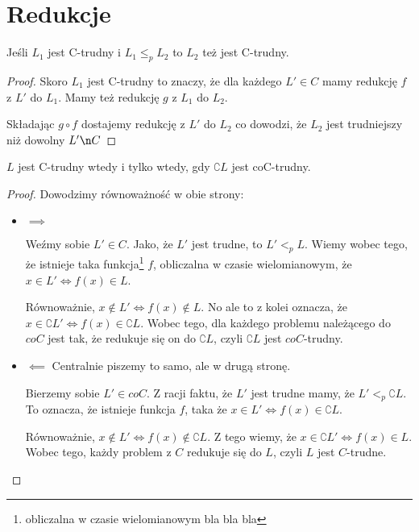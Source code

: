 \section{Redukcje}

\begin{lemma}
    Jeśli \( L_1 \) jest C-trudny i \( L_1 \leq_p L_2 \) to \( L_2 \) też jest C-trudny. 
\end{lemma}

\begin{proof}
    Skoro \( L_1 \) jest C-trudny to znaczy, że dla każdego \( L' \in C \) mamy redukcję \( f \) z \( L' \) do \( L_1 \).
    Mamy też redukcję \( g \) z \( L_1 \) do \( L_2 \).
    
    Składając \( g \circ f \) dostajemy redukcję z \( L' \)  do \( L_2 \) co dowodzi, że \( L_2 \) jest trudniejszy niż dowolny \( L' \n C \)
\end{proof}

\begin{lemma}
    \( L \) jest C-trudny wtedy i tylko wtedy, gdy \( \complement{L} \) jest  coC-trudny. 
\end{lemma}

\begin{proof}

Dowodzimy równoważność w obie strony:

\begin{itemize}
    \item     \( \implies \)
    
    Weźmy sobie \( L' \in C\). Jako, że \(L'\) jest trudne, to \(L' <_{p} L\).  Wiemy wobec tego, że istnieje taka funkcja\footnote{obliczalna w czasie wielomianowym bla bla bla} \(f\), obliczalna w czasie wielomianowym, że \( x \in L' \iff f(x) \in L\).
    
    Równoważnie, \( x \not\in L' \iff f(x) \not \in L\). No ale to z kolei oznacza, że \( x \in \complement{L'} \iff f(x) \in \complement{L}\). Wobec tego, dla każdego problemu należącego do \(coC\) jest tak, że redukuje się on do \( \complement{L} \), czyli \(\complement{L}\) jest \(coC\)-trudny.

    \item \( \impliedby \) 
    Centralnie piszemy to samo, ale w drugą stronę.
    
    
    Bierzemy sobie \( L' \in coC\). Z racji faktu, że \(L'\) jest trudne mamy, że \(L' <_{p} \complement{L}\). To oznacza, że istnieje funkcja \(f\), taka że \( x \in L' \iff f(x) \in \complement{L} \). 
    
    Równoważnie, \( x \not \in L' \iff f(x) \not \in \complement{L} \). Z tego wiemy, że \( x \in \complement{L'} \iff f(x) \in L \). Wobec tego, każdy problem z \(C\) redukuje się do \(L\), czyli \(L\) jest \(C\)-trudne. 
    

\end{itemize}

\end{proof}
